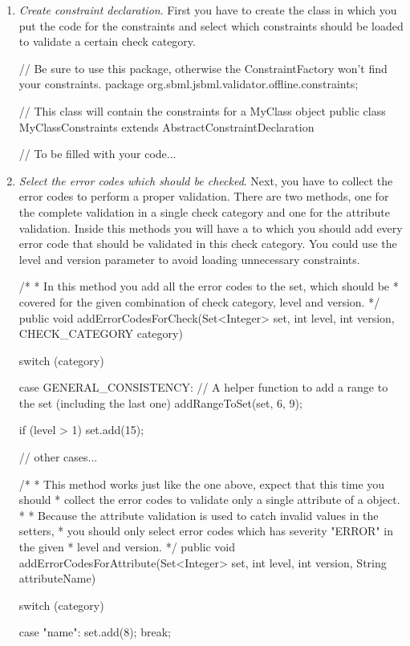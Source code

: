 \begin{enumerate}

\item \emph{Create constraint declaration}. First you have to create the
  class in which you put the code for the constraints and select which
  constraints should be loaded to validate a certain check category.

\begin{example}[style=java, title={Create constraint declaration class}]
// Be sure to use this package, otherwise the ConstraintFactory won't find your constraints.
package org.sbml.jsbml.validator.offline.constraints;

// This class will contain the constraints for a MyClass object
public class MyClassConstraints extends AbstractConstraintDeclaration {
	
	// To be filled with your code...
}
\end{example}

\item \emph{Select the error codes which should be checked}.  Next, you
  have to collect the error codes to perform a proper validation. There are
  two methods, one for the complete validation in a single check category and
  one for the attribute validation. Inside this methods you will have a
   to which you should add every error code that should be
  validated in this check category. You could use the level and version
  parameter to avoid loading unnecessary constraints.

\begin{example}[style=java, title={Select error codes}]
  /*
   * In this method you add all the error codes to the set, which should be 
   * covered for the given combination of check category, level and version.
   */
  public void addErrorCodesForCheck(Set<Integer> set, int level, int version,
    CHECK_CATEGORY category) {
    
    switch (category) {
    case GENERAL_CONSISTENCY:
    	// A helper function to add a range to the set (including the last one)
    	addRangeToSet(set, 6, 9);
    		
    	if (level > 1)
    	{
    		set.add(15);
    	}
    
    // other cases...
  	
    }
  }

  /*
   * This method works just like the one above, expect that this time you should
   * collect the error codes to validate only a single attribute of a object.
   *
   * Because the attribute validation is used to catch invalid values in the setters,
   * you should only select error codes which has severity "ERROR" in the given
   *  level and version.
   */
  public void addErrorCodesForAttribute(Set<Integer> set, int level,
    int version, String attributeName) {
	switch (category) {
    case "name":
    	set.add(8);
    	break;
    	
}}
\end{example}
\end{enumerate}

